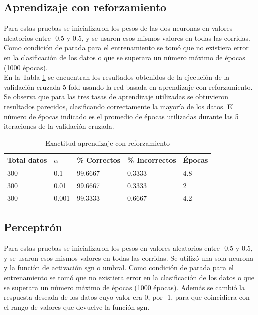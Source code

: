 \documentclass[a4paper]{article}
\begin{document}
	\subsection{Aprendizaje con reforzamiento}
		Para estas pruebas se inicializaron los pesos de las dos neuronas en valores aleatorios entre -0.5 y 0.5, y se usaron esos mismos valores en todas las corridas. Como condición de parada para el entrenamiento se tomó que no existiera error en la clasificación de los datos o que se superara un número máximo de épocas (1000 épocas).\\
		
		En la Tabla \ref{tabla:accReforzamiento} se encuentran los resultados obtenidos de la ejecución de la validación cruzada 5-fold usando la red basada en aprendizaje con reforzamiento. Se observa que para las tres tasas de aprendizaje utilizadas se obtuvieron resultados parecidos, clasificando correctamente la mayoría de los datos. El número de épocas indicado es el promedio de épocas utilizadas durante las 5 iteraciones de la validación cruzada.
		\begin{table}[H]
		\begin{center}
		\begin{tabular}{|l|l|l|l|l|}
		\hline
		Total datos & $\alpha$ & \% Correctos & \% Incorrectos & Épocas\\
		\hline \hline
		300 & 0.1 & 99.6667 & 0.3333 & 4.8 \\ \hline
		300 & 0.01 & 99.6667 & 0.3333 & 2\\ \hline
		300 & 0.001 & 99.3333 & 0.6667 & 4.2\\ \hline
		\end{tabular}
		\caption{Exactitud aprendizaje con reforzamiento}
		\label{tabla:accReforzamiento}
		\end{center}
		\end{table}
	
	\subsection{Perceptrón}
		Para estas pruebas se inicializaron los pesos en valores aleatorios entre -0.5 y 0.5, y se usaron esos mismos valores en todas las corridas. Se utilizó una sola neurona y la función de activación sgn o umbral. Como condición de parada para el entrenamiento se tomó que no existiera error en la clasificación de los datos o que se superara un número máximo de épocas (1000 épocas). Además se cambió la respuesta deseada de los datos cuyo valor era 0, por -1, para que coincidiera con el rango de valores que devuelve la función sgn.\\
		
\end{document}
